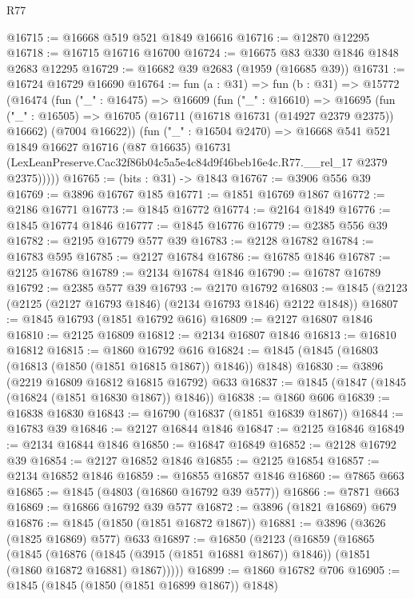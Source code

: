 \begin{lexlean}{R77}
\begin{coremodule}
@16715 := @16668 @519 @521 @1849 @16616
@16716 := @12870 @12295
@16718 := @16715 @16716 @16700
@16724 := @16675 @83 @330 @1846 @1848 @2683 @12295
@16729 := @16682 @39 @2683 (@1959 (@16685 @39))
@16731 := @16724 @16729 @16690
@16764 := fun (a : @31) =>
  fun (b : @31) =>
  @15772
    (@16474
      (fun ("_" : @16475) =>
      @16609
        (fun ("_" : @16610) =>
        @16695
          (fun ("_" : @16505) =>
          @16705 (@16711 (@16718 @16731 (@14927 @2379 @2375)) @16662) (@7004 @16622))
          (fun ("_" : @16504 @2470) =>
          @16668
            @541
            @521
            @1849
            @16627
            @16716
            (@87 @16635)
            @16731
            (LexLeanPreserve.Cac32f86b04c5a5e4c84d9f46beb16e4c.R77.__rel_17 @2379 @2375)))))
@16765 := (bits : @31) -> @1843
@16767 := @3906 @556 @39
@16769 := @3896 @16767 @185
@16771 := @1851 @16769 @1867
@16772 := @2186 @16771
@16773 := @1845 @16772
@16774 := @2164 @1849
@16776 := @1845 @16774 @1846
@16777 := @1845 @16776
@16779 := @2385 @556 @39
@16782 := @2195 @16779 @577 @39
@16783 := @2128 @16782
@16784 := @16783 @595
@16785 := @2127 @16784
@16786 := @16785 @1846
@16787 := @2125 @16786
@16789 := @2134 @16784 @1846
@16790 := @16787 @16789
@16792 := @2385 @577 @39
@16793 := @2170 @16792
@16803 := @1845 (@2123 (@2125 (@2127 @16793 @1846) (@2134 @16793 @1846) @2122 @1848))
@16807 := @1845 @16793 (@1851 @16792 @616)
@16809 := @2127 @16807 @1846
@16810 := @2125 @16809
@16812 := @2134 @16807 @1846
@16813 := @16810 @16812
@16815 := @1860 @16792 @616
@16824 := @1845 (@1845 (@16803 (@16813 (@1850 (@1851 @16815 @1867)) @1846)) @1848)
@16830 := @3896 (@2219 @16809 @16812 @16815 @16792) @633
@16837 := @1845 (@1847 (@1845 (@16824 (@1851 @16830 @1867)) @1846))
@16838 := @1860 @606
@16839 := @16838 @16830
@16843 := @16790 (@16837 (@1851 @16839 @1867))
@16844 := @16783 @39
@16846 := @2127 @16844 @1846
@16847 := @2125 @16846
@16849 := @2134 @16844 @1846
@16850 := @16847 @16849
@16852 := @2128 @16792 @39
@16854 := @2127 @16852 @1846
@16855 := @2125 @16854
@16857 := @2134 @16852 @1846
@16859 := @16855 @16857 @1846
@16860 := @7865 @663
@16865 := @1845 (@4803 (@16860 @16792 @39 @577))
@16866 := @7871 @663
@16869 := @16866 @16792 @39 @577
@16872 := @3896 (@1821 @16869) @679
@16876 := @1845 (@1850 (@1851 @16872 @1867))
@16881 := @3896 (@3626 (@1825 @16869) @577) @633
@16897 := @16850
    (@2123
      (@16859
        (@16865
          (@1845
            (@16876 (@1845 (@3915 (@1851 @16881 @1867)) @1846))
            (@1851 (@1860 @16872 @16881) @1867)))))
@16899 := @1860 @16782 @706
@16905 := @1845 (@1845 (@1850 (@1851 @16899 @1867)) @1848)

\end{coremodule}
\end{lexlean}
